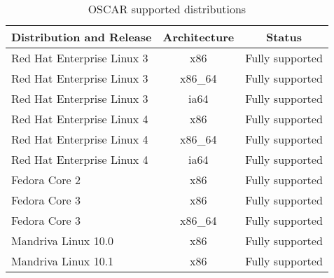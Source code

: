 %
%
%

\begin{table}[htbp]
  \begin{center}
    \begin{tabular}{|l|c|p{3in}|}
      \hline
      \multicolumn{1}{|c|}{Distribution and Release} &
      \multicolumn{1}{|c|}{Architecture} &
      \multicolumn{1}{|c|}{Status} \\
      \hline
      \hline
%
      Red Hat Enterprise Linux 3 & x86 & Fully supported \\
      Red Hat Enterprise Linux 3 & x86\_64 & Fully supported \\
      Red Hat Enterprise Linux 3 & ia64 & Fully supported \\
      Red Hat Enterprise Linux 4 & x86 & Fully supported \\
      Red Hat Enterprise Linux 4 & x86\_64 & Fully supported \\
      Red Hat Enterprise Linux 4 & ia64 & Fully supported \\
%
\hline
%
      Fedora Core 2 & x86 & Fully supported \\
      Fedora Core 3 & x86 & Fully supported \\
      Fedora Core 3 & x86\_64 & Fully supported \\
%
\hline
%
      Mandriva Linux 10.0 & x86 & Fully supported \\
      Mandriva Linux 10.1 & x86 & Fully supported \\
%
\hline
%
    \end{tabular}
    \caption{OSCAR supported distributions}
    \label{tab:oscar-distro-support}
  \end{center}
\end{table}
